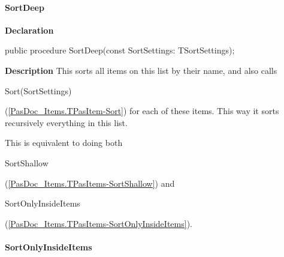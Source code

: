 \documentclass{report}
\newif\ifpdf
\begin{document}
\paragraph*{SortDeep}\hspace*{\fill}

\label{PasDoc_Items.TPasItems-SortDeep}
\begin{list}{}{
\setlength{\itemindent}{0cm}
\setlength{\listparindent}{0cm}
\setlength{\leftmargin}{\evensidemargin}
\addtolength{\leftmargin}{\tmplength}
\settowidth{\labelsep}{X}
\addtolength{\leftmargin}{\labelsep}
\setlength{\labelwidth}{\tmplength}
}
\item[\textbf{Declaration}\hfill]
\ifpdf
\begin{flushleft}
\fi
\begin{ttfamily}
public procedure SortDeep(const SortSettings: TSortSettings);\end{ttfamily}

\ifpdf
\end{flushleft}
\fi

\par
\item[\textbf{Description}]
This sorts all items on this list by their name, and also calls \begin{ttfamily}Sort(SortSettings)\end{ttfamily}(\ref{PasDoc_Items.TPasItem-Sort}) for each of these items. This way it sorts recursively everything in this list.

This is equivalent to doing both \begin{ttfamily}SortShallow\end{ttfamily}(\ref{PasDoc_Items.TPasItems-SortShallow}) and \begin{ttfamily}SortOnlyInsideItems\end{ttfamily}(\ref{PasDoc_Items.TPasItems-SortOnlyInsideItems}).

\end{list}
\paragraph*{SortOnlyInsideItems}\hspace*{\fill}
\end{document}

